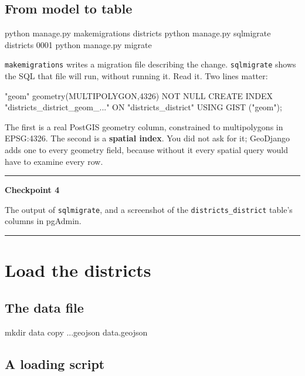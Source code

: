 \documentclass{article}
\newcommand{\cd}[1]{\texttt{#1}}
\newenvironment{keypoint}[1]
  {\par\vspace{.7em}\noindent\rule{\linewidth}{.6pt}\par\vspace{.15em}
   \noindent\textbf{#1}\par\nobreak\vspace{-.3em}}
  {\par\vspace{.15em}\noindent\rule{\linewidth}{.6pt}\par\vspace{.7em}}
\begin{document}
\subsection{From model to table}

\begin{code}
python manage.py makemigrations districts
python manage.py sqlmigrate districts 0001
python manage.py migrate
\end{code}

\cd{makemigrations} writes a migration file describing the change.
\cd{sqlmigrate} shows the SQL that file will run, without running it.
Read it. Two lines matter:

\begin{code}
"geom" geometry(MULTIPOLYGON,4326) NOT NULL
CREATE INDEX "districts_district_geom_..." ON "districts_district" USING GIST ("geom");
\end{code}

The first is a real PostGIS geometry column, constrained to
multipolygons in EPSG:4326. The second is a \textbf{spatial index}. You
did not ask for it; GeoDjango adds one to every geometry field, because
without it every spatial query would have to examine every row.

\begin{keypoint}{Checkpoint 4}
The output of \cd{sqlmigrate}, and a screenshot of the
\cd{districts\_district} table's columns in pgAdmin.
\end{keypoint}


\section{Load the districts}

\subsection{The data file}

\begin{code}
mkdir data
copy ..\data\districts.geojson data\districts.geojson
\end{code}

\subsection{A loading script}
\end{document}
